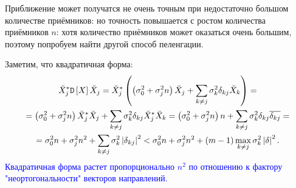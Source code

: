 Приближение может получатся не очень точным при недостаточно большом количестве приёмников:
\noindent но точность повышается с ростом количества приёмников $n$:
\noindent хотя количество приёмников может оказаться очень большим, поэтому попробуем найти другой способ пеленгации.

Заметим, что квадратичная форма:
\begin{multline*}
    \breve{X}_j^* \mathtt{D} \left [ X \right ] \breve{X}_j
    = \breve{X}_j^* \left ( \left ( \sigma_0^2 + \sigma_j^2 n \right ) \breve{X}_j + \sum_{k \neq j} \sigma_k^2 \delta_{kj} \breve{X}_k \right ) = \\
    = \left ( \sigma_0^2 + \sigma_j^2 n \right ) \breve{X}_j^* \breve{X}_j + \sum_{k \neq j} \sigma_k^2 \delta_{kj} \breve{X}_j^* \breve{X}_k
    = \left ( \sigma_0^2 + \sigma_j^2 n \right ) n + \sum_{k \neq j} \sigma_k^2 \delta_{kj} \overline{\delta_{kj}} = \\
    = \sigma_0^2 n + \sigma_j^2 n^2 + \sum_{k \neq j} \sigma_k^2 \left | \delta_{kj} \right |^2
    < \sigma_0^2 n + \sigma_j^2 n^2 + (m-1) \max \limits_{k \neq j} \sigma_k^2 \left | \delta \right |^2 .
\end{multline*}
\textcolor{blue}{Квадратичная форма растет пропорционально $n^2$ по отношению к фактору "неортогональности"{} векторов направлений.}

